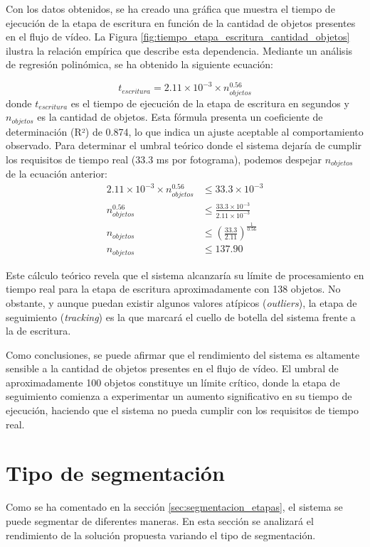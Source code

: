 \documentclass[11pt,spanish,listoffigures,listoftables]{tfgetsinf}
\begin{document}
Con los datos obtenidos, se ha creado una gráfica que muestra el tiempo de ejecución de la etapa de escritura en función de la cantidad de objetos presentes en el flujo de vídeo. La Figura \ref{fig:tiempo_etapa_escritura_cantidad_objetos} ilustra la relación empírica que describe esta dependencia. Mediante un análisis de regresión polinómica, se ha obtenido la siguiente ecuación:

\begin{equation}
   t_{escritura} = 2.11 \times 10^{-3} \times n_{objetos}^{0.56}
\end{equation}
donde $t_{escritura}$ es el tiempo de ejecución de la etapa de escritura en segundos y $n_{objetos}$ es la cantidad de objetos. Esta fórmula presenta un coeficiente de determinación (R²) de 0.874, lo que indica un ajuste aceptable al comportamiento observado.
Para determinar el umbral teórico donde el sistema dejaría de cumplir los requisitos de tiempo real (33.3 ms por fotograma), podemos despejar $n_{objetos}$ de la ecuación anterior:
\begin{align}
   2.11 \times 10^{-3} \times n_{objetos}^{0.56} &\leq 33.3 \times 10^{-3} \\
   n_{objetos}^{0.56} &\leq \frac{33.3 \times 10^{-3}}{2.11 \times 10^{-3}} \\
   n_{objetos} &\leq \left(\frac{33.3}{2.11}\right)^{\frac{1}{0.56}} \\
   n_{objetos} &\leq 137.90
\end{align}

Este cálculo teórico revela que el sistema alcanzaría su límite de procesamiento en tiempo real para la etapa de escritura aproximadamente con 138 objetos. No obstante, y aunque puedan existir algunos valores atípicos (\textit{outliers}), la etapa de seguimiento (\textit{tracking}) es la que marcará el cuello de botella del sistema frente a la de escritura.

Como conclusiones, se puede afirmar que el rendimiento del sistema es altamente sensible a la cantidad de objetos presentes en el flujo de vídeo. El umbral de aproximadamente 100 objetos constituye un límite crítico, donde la etapa de seguimiento comienza a experimentar un aumento significativo en su tiempo de ejecución, haciendo que el sistema no pueda cumplir con los requisitos de tiempo real.

\section{Tipo de segmentación} \label{sub:analisis_segmentacion}
Como se ha comentado en la sección \ref{sec:segmentacion_etapas}, el sistema se puede segmentar de diferentes maneras. En esta sección se analizará el rendimiento de la solución propuesta variando el tipo de segmentación.
\end{document}
